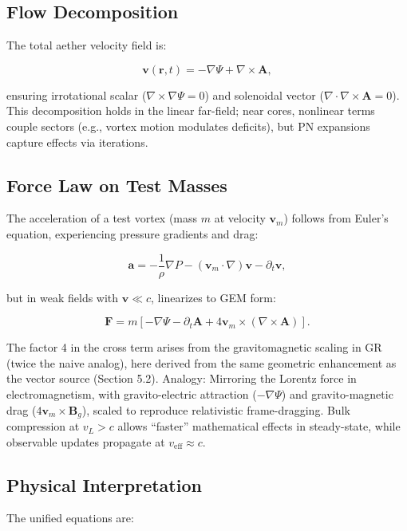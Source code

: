 \documentclass{article}
\begin{document}
\subsection{Flow Decomposition}

The total aether velocity field is:

\[
\mathbf{v}(\mathbf{r}, t) = -\nabla \Psi + \nabla \times \mathbf{A},
\]

ensuring irrotational scalar ($\nabla \times \nabla \Psi = 0$) and solenoidal vector ($\nabla \cdot \nabla \times \mathbf{A} = 0$). This decomposition holds in the linear far-field; near cores, nonlinear terms couple sectors (e.g., vortex motion modulates deficits), but PN expansions capture effects via iterations.

\subsection{Force Law on Test Masses}

The acceleration of a test vortex (mass $m$ at velocity $\mathbf{v}_m$) follows from Euler's equation, experiencing pressure gradients and drag:

\[
\mathbf{a} = -\frac{1}{\rho} \nabla P - (\mathbf{v}_m \cdot \nabla) \mathbf{v} - \partial_t \mathbf{v},
\]

but in weak fields with $\mathbf{v} \ll c$, linearizes to GEM form:

\[
\mathbf{F} = m \left[ -\nabla \Psi - \partial_t \mathbf{A} + 4 \mathbf{v}_m \times (\nabla \times \mathbf{A}) \right].
\]

The factor 4 in the cross term arises from the gravitomagnetic scaling in GR (twice the naive analog), here derived from the same geometric enhancement as the vector source (Section 5.2). Analogy: Mirroring the Lorentz force in electromagnetism, with gravito-electric attraction ($-\nabla \Psi$) and gravito-magnetic drag ($4 \mathbf{v}_m \times \mathbf{B}_g$), scaled to reproduce relativistic frame-dragging. Bulk compression at $v_L > c$ allows ``faster'' mathematical effects in steady-state, while observable updates propagate at $v_{\text{eff}} \approx c$.

\subsection{Physical Interpretation}

The unified equations are:

\end{document}
